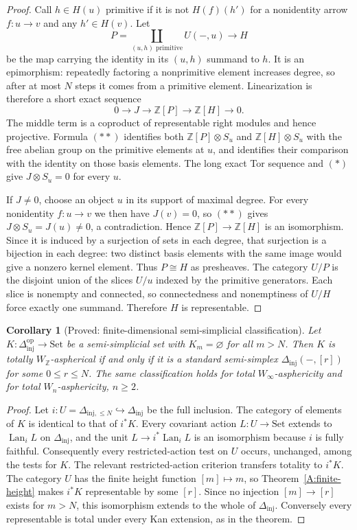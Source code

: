 \documentclass[11pt,a4paper]{article}
\newtheorem{corollary}[theorem]{Corollary}
\theoremstyle{definition}
\theoremstyle{remark}
\begin{document}
\begin{proof}
Call $h\in H(u)$ primitive if it is not $H(f)(h')$ for a nonidentity arrow $f:u\to v$ and any $h'\in H(v)$. Let
\[
 P=\coprod_{(u,h)\text{ primitive}}U(-,u)
 \longrightarrow H
\]
be the map carrying the identity in its $(u,h)$ summand to $h$. It is an epimorphism: repeatedly factoring a nonprimitive element increases degree, so after at most $N$ steps it comes from a primitive element. Linearization is therefore a short exact sequence
\[
 0\longrightarrow J\longrightarrow\mathbb Z[P]\longrightarrow\mathbb Z[H]\longrightarrow0.
\]
The middle term is a coproduct of representable right modules and hence projective. Formula $(\ast\ast)$ identifies both $\mathbb Z[P]\otimes S_u$ and $\mathbb Z[H]\otimes S_u$ with the free abelian group on the primitive elements at $u$, and identifies their comparison with the identity on those basis elements. The long exact Tor sequence and $(\ast)$ give $J\otimes S_u=0$ for every $u$.

If $J\ne0$, choose an object $u$ in its support of maximal degree. For every nonidentity $f:u\to v$ we then have $J(v)=0$, so $(\ast\ast)$ gives $J\otimes S_u=J(u)\ne0$, a contradiction. Hence $\mathbb Z[P]\to\mathbb Z[H]$ is an isomorphism. Since it is induced by a surjection of sets in each degree, that surjection is a bijection in each degree: two distinct basis elements with the same image would give a nonzero kernel element. Thus $P\cong H$ as presheaves. The category $U/P$ is the disjoint union of the slices $U/u$ indexed by the primitive generators. Each slice is nonempty and connected, so connectedness and nonemptiness of $U/H$ force exactly one summand. Therefore $H$ is representable.
\end{proof}

\begin{corollary}[Proved: finite-dimensional semi-simplicial classification]\label{A:finite-dimensional-semisimplicial}
Let $K:\Delta_{\mathrm{inj}}^{\mathrm{op}}\to\mathrm{Set}$ be a semi-simplicial set with $K_m=\varnothing$ for all $m>N$. Then $K$ is totally $W_{\mathbb Z}$-aspherical if and only if it is a standard semi-simplex $\Delta_{\mathrm{inj}}(-,[r])$ for some $0\leq r\leq N$. The same classification holds for total $W_\infty$-asphericity and for total $W_n$-asphericity, $n\geq2$.
\end{corollary}
\begin{proof}
Let $i:U=\Delta_{\mathrm{inj},\leq N}\hookrightarrow\Delta_{\mathrm{inj}}$ be the full inclusion. The category of elements of $K$ is identical to that of $i^*K$. Every covariant action $L:U\to\mathrm{Set}$ extends to $\operatorname{Lan}_iL$ on $\Delta_{\mathrm{inj}}$, and the unit $L\to i^*\operatorname{Lan}_iL$ is an isomorphism because $i$ is fully faithful. Consequently every restricted-action test on $U$ occurs, unchanged, among the tests for $K$. The relevant restricted-action criterion transfers totality to $i^*K$. The category $U$ has the finite height function $[m]\mapsto m$, so Theorem~\ref{A:finite-height} makes $i^*K$ representable by some $[r]$. Since no injection $[m]\to[r]$ exists for $m>N$, this isomorphism extends to the whole of $\Delta_{\mathrm{inj}}$. Conversely every representable is total under every Kan extension, as in the theorem.
\end{proof}
\end{document}
